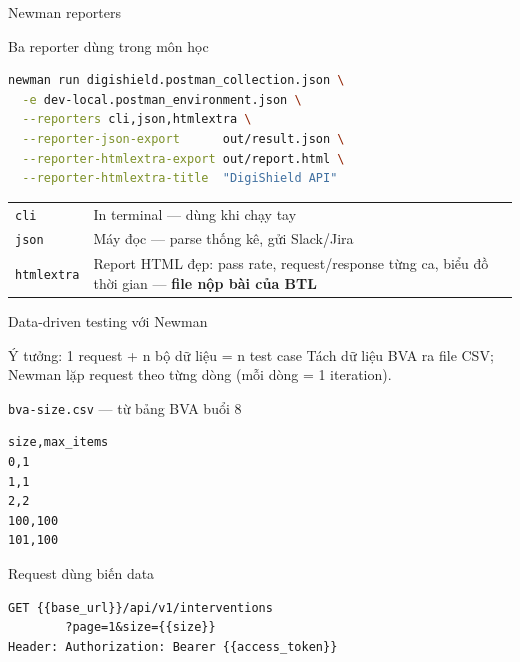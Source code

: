 \documentclass[aspectratio=169,12pt]{beamer}
\begin{document}
\begin{frame}[fragile]{Newman reporters}
  \begin{block}{Ba reporter dùng trong môn học}
\begin{lstlisting}[language=bash]
newman run digishield.postman_collection.json \
  -e dev-local.postman_environment.json \
  --reporters cli,json,htmlextra \
  --reporter-json-export      out/result.json \
  --reporter-htmlextra-export out/report.html \
  --reporter-htmlextra-title  "DigiShield API"
\end{lstlisting}
  \end{block}

  \begin{center}
  \small
  \begin{tabular}{p{2.2cm}p{8.6cm}}
    \toprule
    \texttt{cli} & In terminal --- dùng khi chạy tay \\
    \texttt{json} & Máy đọc --- parse thống kê, gửi Slack/Jira \\
    \texttt{htmlextra} & Report HTML đẹp: pass rate, request/response từng ca, biểu đồ thời gian --- \textbf{file nộp bài của BTL} \\
    \bottomrule
  \end{tabular}
  \end{center}
\end{frame}

\begin{frame}[fragile]{Data-driven testing với Newman}
  \begin{block}{Ý tưởng: 1 request + n bộ dữ liệu = n test case}
    Tách dữ liệu BVA ra file CSV; Newman lặp request theo từng dòng
    (mỗi dòng = 1 iteration).
  \end{block}

  \begin{block}{\texttt{bva-size.csv} --- từ bảng BVA buổi 8}
\begin{lstlisting}[language={}]
size,max_items
0,1
1,1
2,2
100,100
101,100
\end{lstlisting}
  \end{block}

  \vspace{-0.4em}
  \begin{block}{Request dùng biến data}
\begin{lstlisting}[language={}]
GET {{base_url}}/api/v1/interventions
        ?page=1&size={{size}}
Header: Authorization: Bearer {{access_token}}
\end{lstlisting}
  \end{block}
\end{frame}
\end{document}
